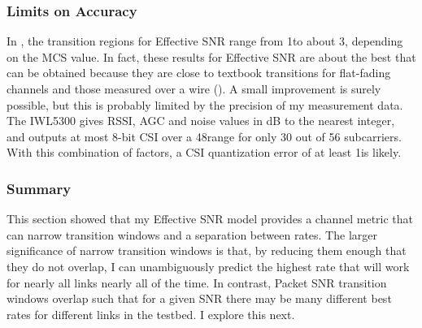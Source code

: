 \subsubsection{Limits on Accuracy}
In , the transition regions for Effective SNR range from 1\dB to about 3\dB, depending on the MCS value. In fact, these results for Effective SNR are about the best that can be obtained because they are close to textbook transitions for flat-fading channels and those measured over a wire (). A small improvement is surely possible, but this is probably limited by the precision of my measurement data. The IWL5300 gives RSSI, AGC and noise values in dB to the nearest integer, and outputs at most 8-bit CSI over a 48\dB range for only 30 out of 56 subcarriers. With this combination of factors, a CSI quantization error of at least 1\dB is likely.

\subsubsection{Summary}
This section showed that my Effective SNR model provides a channel metric that can narrow transition windows and a separation between rates. The larger significance of narrow transition windows is that, by reducing them enough that they do not overlap, I can unambiguously predict the highest rate that will work for nearly all links nearly all of the time. In contrast, Packet SNR transition windows overlap such that for a given SNR there may be many different best rates for different links in the testbed. I explore this next.

